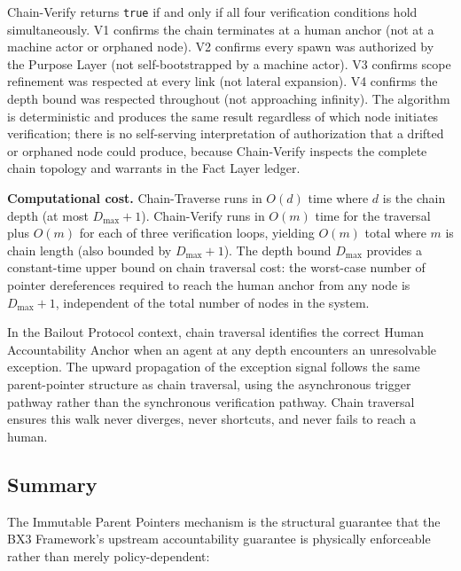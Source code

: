 Chain-Verify returns \texttt{true} if and only if all four verification conditions hold simultaneously. V1 confirms the chain terminates at a human anchor (not at a machine actor or orphaned node). V2 confirms every spawn was authorized by the Purpose Layer (not self-bootstrapped by a machine actor). V3 confirms scope refinement was respected at every link (not lateral expansion). V4 confirms the depth bound was respected throughout (not approaching infinity). The algorithm is deterministic and produces the same result regardless of which node initiates verification; there is no self-serving interpretation of authorization that a drifted or orphaned node could produce, because Chain-Verify inspects the complete chain topology and warrants in the Fact Layer ledger.

\bigskip
\noindent\textbf{Computational cost.} Chain-Traverse runs in $O(d)$ time where $d$ is the chain depth (at most $D_{\max} + 1$). Chain-Verify runs in $O(m)$ time for the traversal plus $O(m)$ for each of three verification loops, yielding $O(m)$ total where $m$ is chain length (also bounded by $D_{\max} + 1$). The depth bound $D_{\max}$ provides a constant-time upper bound on chain traversal cost: the worst-case number of pointer dereferences required to reach the human anchor from any node is $D_{\max} + 1$, independent of the total number of nodes in the system.

In the Bailout Protocol context, chain traversal identifies the correct Human Accountability Anchor when an agent at any depth encounters an unresolvable exception. The upward propagation of the exception signal follows the same parent-pointer structure as chain traversal, using the asynchronous trigger pathway rather than the synchronous verification pathway. Chain traversal ensures this walk never diverges, never shortcuts, and never fails to reach a human.

\subsection{Summary}

The Immutable Parent Pointers mechanism is the structural guarantee that the BX3 Framework's upstream accountability guarantee is physically enforceable rather than merely policy-dependent:

